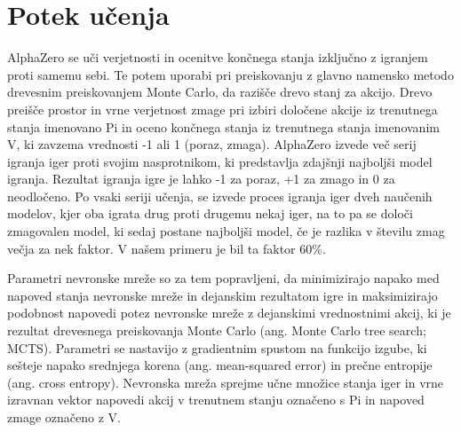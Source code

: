 \documentclass[a4paper, 12pt]{book}
\begin{document}
\section{Potek učenja}
\label{potekUcenja}
AlphaZero se uči verjetnosti in ocenitve končnega stanja izključno z igranjem proti samemu sebi. 
Te potem uporabi pri preiskovanju z glavno namensko metodo drevesnim preiskovanjem Monte Carlo, da razišče drevo stanj za akcijo.
Drevo preišče prostor in vrne verjetnost zmage pri izbiri določene akcije iz trenutnega stanja imenovano Pi in oceno končnega stanja iz trenutnega stanja imenovanim V, ki zavzema vrednosti -1 ali 1 (poraz, zmaga).
AlphaZero izvede več serij igranja iger proti svojim nasprotnikom, ki predstavlja zdajšnji najboljši model igranja.
Rezultat igranja igre je lahko -1 za poraz, +1 za zmago in 0 za neodločeno.
Po vsaki seriji učenja, se izvede proces igranja iger dveh naučenih modelov, kjer oba igrata drug proti drugemu nekaj iger, na to pa se določi zmagovalen model, ki sedaj postane najboljši model, če je razlika v številu zmag večja za nek faktor. V našem primeru je bil ta faktor 60\%.


Parametri nevronske mreže so za tem popravljeni, da minimizirajo napako med napoved stanja nevronske mreže in dejanskim rezultatom igre in maksimizirajo podobnost napovedi potez nevronske mreže z dejanskimi vrednostnimi akcij, ki je rezultat drevesnega preiskovanja Monte Carlo (ang. Monte Carlo tree search; MCTS). 
Parametri se nastavijo z gradientnim spustom na funkcijo izgube, ki sešteje napako srednjega korena (ang. mean-squared error) in prečne entropije (ang. cross entropy).
Nevronska mreža sprejme učne množice stanja iger in vrne izravnan vektor napovedi akcij v trenutnem stanju označeno s Pi in napoved zmage označeno z V.
\end{document}

